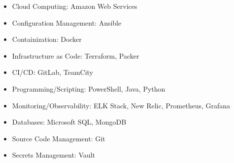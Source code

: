 \documentclass{article}
\begin{document}
\begin{multicols}{2}
\raggedcolumns
\begin{itemize}
\item Cloud Computing: Amazon Web Services
\item Configuration Management: Ansible
\item Containization: Docker
\item Infrastructure as Code: Terraform, Packer
\item CI/CD: GitLab, TeamCity
\item Programming/Scripting: PowerShell, Java, Python
\item Monitoring/Observability: ELK Stack, New Relic, Prometheus, Grafana
\item Databases: Microsoft SQL, MongoDB
\item Source Code Management: Git
\item Secrets Management: Vault
\end{itemize}
\end{multicols}
\end{document}
